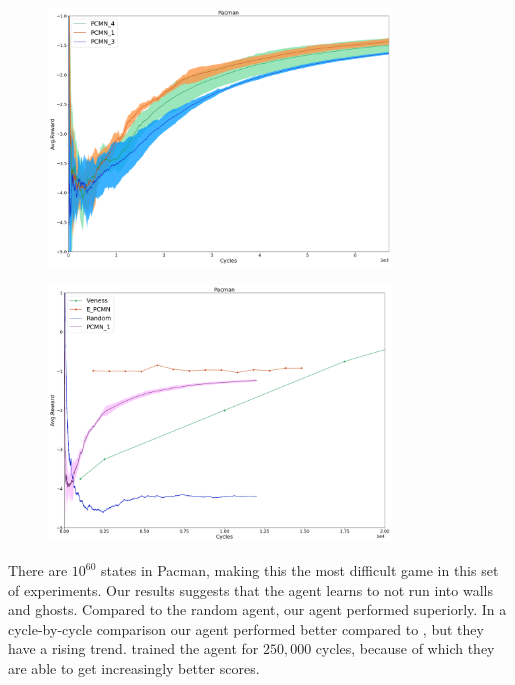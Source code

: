 \documentclass{article}
\theoremstyle{definition}
\newtheorem{primary statistics}[definition]{Primary Statistics}
\newtheorem{auxiliary statistics}[definition]{Auxiliary Statistics}
\begin{document}
 \begin{figure}[h]
 \centering
    \includegraphics[width=9.1cm]{4_Pacman}
\end{figure}

 \begin{figure}[h]
 \centering
    \includegraphics[width=9.1cm]{Pacman}
\end{figure}

There are $10^{60}$ states in Pacman, making this the most difficult game in this set of experiments. Our results suggests that the agent learns to not run into walls and ghosts. Compared to the random agent, our agent performed superiorly. In a cycle-by-cycle comparison our agent performed better compared to \cite{veness2011monte}, but they have a rising trend. \cite{veness2011monte} trained the agent for $250,000$ cycles, because of which they are able to get increasingly better scores.

\newpage
\end{document}
